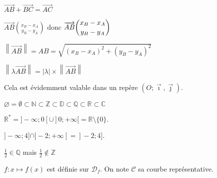 $\overrightarrow{AB} + \overrightarrow{BC} = \overrightarrow{AC}$\medskip

$\overrightarrow{AB}\binom{x_B - x_A}{y_B - y_A}$ \quad donc \quad
$\overrightarrow{AB}\dbinom{x_B - x_A}{y_B - y_A}$\par\medskip
$\left\lVert \overrightarrow{AB} \right\rVert = AB = \sqrt{(x_B - x_A)^2 + (y_B - y_A)^2}$

\medskip

$\left\lVert \lambda \overrightarrow{AB}\right\rVert =
\left\lvert \lambda \right\rvert \times \left\lVert \overrightarrow{AB}\right\rVert$\par\medskip
Cela est évidemment valable dans un repère
$\left(O ; \overrightarrow\imath, \overrightarrow\jmath\right)$.\medskip

$\varnothing = \emptyset \subset \mathds N \subset \mathds Z \subset
\mathds D \subset \mathds Q\subset \mathds R \subset \mathds C$ \medskip

$\mathds R^*=]-\infty ; 0[ \cup ]0 ; +\infty[ = \mathds R \setminus \{0\}$.\medskip

$]-\infty ; 4] \cap ]-2 ; +\infty[ = ]-2 ; 4]$.\medskip

$\frac 1 2 \in \mathds Q$ mais $\frac 1 2 \notin \mathds Z$\medskip

$f\colon x \mapsto f(x)$ est définie sur $\mathcal D_f$.
On note $\mathcal C$ sa courbe représentative.